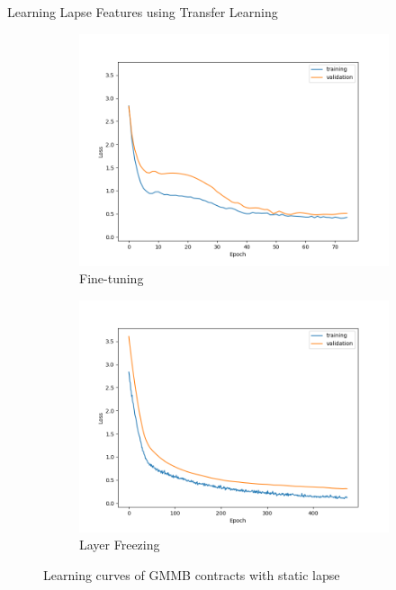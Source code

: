 \documentclass[9pt,handout]{beamer}
\begin{document}
\begin{frame}{Learning Lapse Features using Transfer Learning}

    \begin{figure}[ht]
        \centering
        \begin{subfigure}{0.48\textwidth}
            \includegraphics[width=\textwidth]{../project3/figures/figure1c.png}
            \caption{Fine-tuning}
        \end{subfigure}
        \begin{subfigure}{0.48\textwidth}
            \includegraphics[width=\textwidth]{../project3/figures/figure1d.png}
            \caption{Layer Freezing}
        \end{subfigure}
        \caption{Learning curves of GMMB contracts with static lapse}
    \end{figure}
    
\end{frame}    
    
\end{document}
